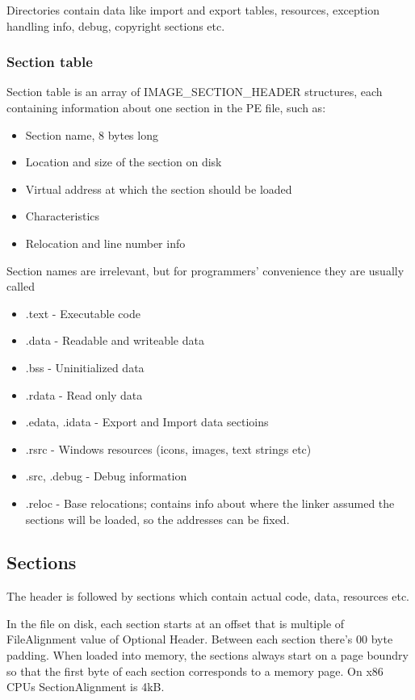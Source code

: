 \documentclass[a4paper,12pt]{article}
\begin{document}
Directories contain data like import and export tables, resources, exception
handling info, debug, copyright sections etc.

\subsubsection{Section table}
Section table is an array of IMAGE\_SECTION\_HEADER structures, each containing
information about one section in the PE file, such as:
\begin{itemize}
\item Section name, 8 bytes long
\item Location and size of the section on disk
\item Virtual address at which the section should be loaded
\item Characteristics
\item Relocation and line number info
\end{itemize}

Section names are irrelevant, but for programmers'
convenience they are usually called

\begin{itemize}
\item .text - Executable code
\item .data - Readable and writeable data
\item .bss - Uninitialized data
\item .rdata - Read only data
\item .edata, .idata - Export and Import data sectioins
\item .rsrc - Windows resources (icons, images, text strings etc)
\item .src, .debug - Debug information
\item .reloc - Base relocations; contains info about where the linker
    assumed the sections will be loaded, so the addresses can be fixed.
\end{itemize}

\subsection{Sections}
The header is followed by sections which contain actual code, data, resources
etc.

In the file on disk, each section starts at an offset that is multiple of
FileAlignment value of Optional Header. Between each section there's 00 byte
padding. When loaded into memory, the sections always start on a page boundry
so that the first byte of each section corresponds to a memory page. On x86
CPUs SectionAlignment is 4kB.
\end{document}

